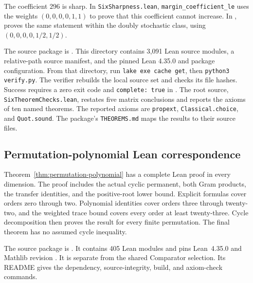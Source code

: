 \documentclass[11pt,a4paper]{article}
\theoremstyle{definition}
\theoremstyle{remark}
\begin{document}
The coefficient $296$ is sharp. In \texttt{SixSharpness.lean},
\texttt{margin\_coefficient\_le} uses the weights $(0,0,0,0,1,1)$
to prove that this coefficient cannot increase. In
,
 proves the same statement
within the doubly stochastic class, using $(0,0,0,0,1/2,1/2)$.

The source package is .
This directory contains 3,091 Lean
source modules, a relative-path source manifest, and the pinned Lean
4.35.0 and package configuration. From that directory, run
\texttt{lake exe cache get}, then \texttt{python3 verify.py}.
The verifier rebuilds the local source set and checks its file hashes.
Success requires a zero exit code and \texttt{complete: true} in
. The root source,
\texttt{SixTheoremChecks.lean}, restates five matrix conclusions and
reports the axioms of ten named theorems. The reported axioms are
\texttt{propext}, \texttt{Classical.choice}, and \texttt{Quot.sound}.
The package's \texttt{THEOREMS.md} maps the results to their source files.


\subsection{Permutation-polynomial Lean correspondence}

Theorem~\ref{thm:permutation-polynomial} has a complete Lean proof in every dimension.
The proof includes the actual cyclic permanent, both Gram products, the transfer identities, and the positive-root lower bound.
Explicit formulas cover orders zero through two.
Polynomial identities cover orders three through twenty-two, and the weighted trace bound covers every order at least twenty-three.
Cycle decomposition then proves the result for every finite permutation.
The final theorem has no assumed cycle inequality.

The source package is
.
It contains 405 Lean modules and pins Lean~4.35.0 and Mathlib revision
.
It is separate from the shared Comparator selection.
Its README gives the dependency, source-integrity, build, and axiom-check commands.
\end{document}
